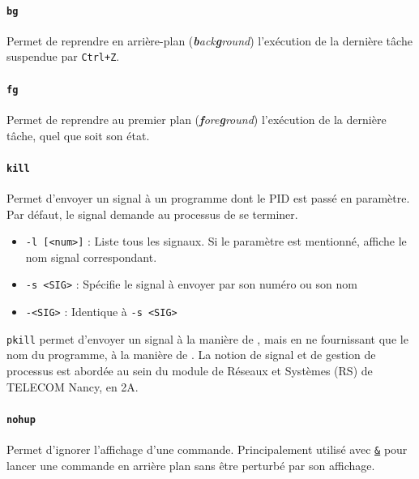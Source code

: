 \paragraph{\texttt{bg}} 
Permet de reprendre en arrière-plan (\textit{\textbf{b}ack\textbf{g}round}) l'exécution de la dernière tâche suspendue par \texttt{Ctrl+Z}.

\paragraph{\texttt{fg}} 
Permet de reprendre au premier plan (\textit{\textbf{f}ore\textbf{g}round}) l'exécution de la dernière tâche, quel que soit son état.



\paragraph{\texttt{kill}} 
Permet d'envoyer un signal à un programme dont le PID est passé en paramètre. Par défaut, le signal demande au processus de se terminer.
\begin{itemize}
    \item \texttt{-l [<num>]} : Liste tous les signaux. Si le paramètre est mentionné, affiche le nom signal correspondant.
    \item \texttt{-s <SIG>} : Spécifie le signal à envoyer par son numéro ou son nom
    \item \texttt{-<SIG>} : Identique à \texttt{-s <SIG>}
\end{itemize}

 \texttt{pkill} permet d'envoyer un signal à la manière de , mais en ne fournissant que le nom du programme, à la manière de . \newline
{} La notion de signal et de gestion de processus est abordée au sein du module de Réseaux et Systèmes (RS) de TELECOM Nancy, en 2A. 

\paragraph{\texttt{nohup}} 
Permet d'ignorer l'affichage d'une commande. Principalement utilisé avec \hyperref[cmd:fork]{\texttt{\&}} pour lancer une commande en arrière plan sans être perturbé par son affichage.
